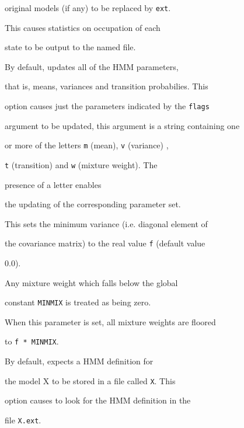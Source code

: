 \begin{optlist}
      original models (if any) to be replaced by {\tt ext}.





   This causes statistics on occupation of each


      state to be output to the named file.  


      


   By default,  updates all of the HMM parameters,


      that is, means, variances and transition probabilies. This 


      option causes just the parameters indicated by the {\tt flags}


      argument to be updated, this argument is a string containing one


      or more of the letters {\tt m} (mean), {\tt v} (variance) ,


      {\tt t} (transition) and {\tt w} (mixture weight).  The 


      presence of a letter enables


      the updating of the corresponding parameter set.





    This sets the minimum variance (i.e. diagonal element of


      the covariance matrix) to the real value {\tt f} (default value


      0.0).


  


    Any mixture weight which falls below the global


            constant {\tt MINMIX} is treated as being zero.


      When this parameter is  set,  all mixture weights  are floored


      to {\tt f * MINMIX}.


     


    By default,  expects a HMM definition for 


      the model X to be stored in a file called {\tt X}.  This


      option causes  to look for the HMM definition in the


      file {\tt X.ext}.





\stdoptB


\stdoptH


\stdoptM





\end{optlist}


